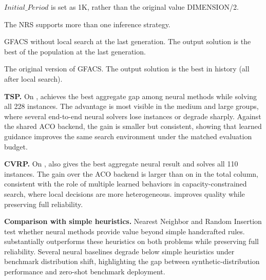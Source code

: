 \begin{table}[htbp]
\begin{threeparttable}
\begin{tabular}{c|l|ccc|ccc|ccc|cc}
    \bottomrule[0.5mm]
    \end{tabular}%
    \begin{tablenotes}
      \footnotesize
      \item[$\downarrow$] $Initial\_Period$ is set as 1K, rather than the original value DIMENSION/2.
      \item[$*$]  The NRS supports more than one inference strategy.
      \item[$\dagger$] GFACS without local search at the last generation. The output solution is the best of the population at the last generation.
      \item[$\ddagger$] The original version of GFACS\@. The output solution is the best in history (all after local search). 
      
    \end{tablenotes}
    \end{threeparttable}
    \vspace{-0.6cm}
  \label{tab:exp_proposed}%
\end{table}%

\smallskip\noindent\textbf{TSP.}
On \TSP{}, \DyNACS{} achieves the best aggregate gap among neural methods while solving all 228 instances. The advantage is most visible in the medium and large groups, where several end-to-end neural solvers lose instances or degrade sharply. Against the shared ACO backend, the gain is smaller but consistent, showing that learned guidance improves the same search environment under the matched evaluation budget.

\smallskip\noindent\textbf{CVRP.}
On \CVRP{}, \DyNACS{} also gives the best aggregate neural result and solves all 110 instances. The gain over the ACO backend is larger than on \TSP{} in the total column, consistent with the role of multiple learned behaviors in capacity-constrained search, where local decisions are more heterogeneous. \DyNACS{} improves quality while preserving full reliability.

\smallskip\noindent\textbf{Comparison with simple heuristics.}
Nearest Neighbor and Random Insertion test whether neural methods provide value beyond simple handcrafted rules. \DyNACS{} substantially outperforms these heuristics on both problems while preserving full reliability. Several neural baselines degrade below simple heuristics under benchmark distribution shift, highlighting the gap between synthetic-distribution performance and zero-shot benchmark deployment.

